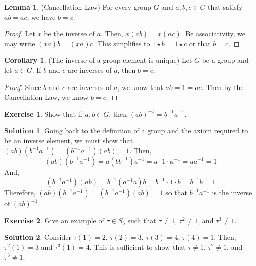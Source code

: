 \documentclass[12pt]{article}
\theoremstyle{definition}
\newtheorem{corollary}{Corollary}
\newtheorem{exercise}{\color{YellowOrange}Exercise}
\newtheorem{lemma}{Lemma}
\theoremstyle{definition}
\newtheorem{solution}{\color{Goldenrod}Solution}
\begin{document}
\begin{lemma}(Cancellation Law)
For every group $G$ and $a,b,c \in G$ that satisfy $ab = ac$, we have $b=c$.
\end{lemma}
\begin{proof}
Let $x$ be the inverse of $a$. Then, $x(ab) = x(ac)$. Be associativity, we may write $(xa)b = (xa)c$. This simplifies to $1 \star b = 1 \star c$ or that $b = c$.
\end{proof}

\begin{corollary}(The inverse of a group element is unique)
Let $G$ be a group and let $a \in G$. If $b$ and $c$ are inverses of $a$, then $b = c$. 
\end{corollary}
\begin{proof}
Since $b$ and $c$ are inverses of $a$, we know that $ab = 1 = ac$. Then by the Cancellation Law, we know $b=c$.
\end{proof}

\begin{exercise}
Show that if $a,b \in G$, then $(ab)^{-1} = b^{-1}a^{-1}$.
\end{exercise}
\begin{solution} Going back to the definition of a group and the axiom required to be an inverse element, we must show that $(ab)(b^{-1}a^{-1}) = (b^{-1}a^{-1})(ab) = 1$. Then,
\begin{equation}
(ab)(b^{-1}a^{-1}) = a (bb^{-1}) a^{-1} = a \cdot 1 \cdot a^{-1} = aa^{-1} = 1
\end{equation}
And,
\begin{equation}
(b^{-1}a^{-1})(ab) = b^{-1} (a^{-1}a) b = b^{-1} \cdot 1 \cdot b = b^{-1}b = 1
\end{equation}
Therefore, $(ab)(b^{-1}a^{-1}) = (b^{-1}a^{-1})(ab) = 1$ so that $b^{-1}a^{-1}$ is the inverse of $(ab)^{-1}$.
\end{solution}

\begin{exercise}
Give an example of $\tau \in S_3$ such that $\tau \neq 1$, $\tau^2 \neq 1$, and $\tau^3 \neq 1$.
\end{exercise}
\begin{solution}
Consider $\tau(1) = 2$, $\tau(2) = 3$, $\tau(3) = 4$, $\tau(4) = 1$. Then, $\tau^2(1) = 3$ and $\tau^3(1) = 4$. This is sufficient to show that $\tau \neq 1$, $\tau^2 \neq 1$, and $\tau^3 \neq 1$.
\end{solution}
\end{document}
